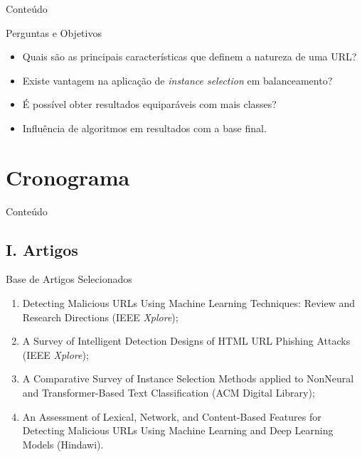 \documentclass{beamer}
\begin{document}
\begin{frame}{Conteúdo} 
     \tableofcontents[currentsection]
\end{frame}

\begin{frame}{Perguntas e Objetivos}
    
    \begin{itemize}[<+-| alert@+>]
        \setlength{\itemsep}{10pt}
        \item Quais são as principais características que definem a natureza de uma URL?
        \item Existe vantagem na aplicação de \emph{instance selection} em balanceamento?
        \item É possível obter resultados equiparáveis com mais classes?
        \item Influência de algoritmos em resultados com a base final.
    \end{itemize}
    
\end{frame}

\section{Cronograma}

\begin{frame}{Conteúdo} 
     \tableofcontents[currentsection]
\end{frame}

\subsection{I. Artigos}

\begin{frame}{Base de Artigos Selecionados}

    \begin{enumerate}[<+-| alert@+>]
        \setlength{\itemsep}{10pt}
        \item Detecting Malicious URLs Using Machine Learning Techniques: Review and Research Directions (IEEE \emph{Xplore\textregistered});
        \item A Survey of Intelligent Detection Designs of HTML URL Phishing Attacks (IEEE \emph{Xplore\textregistered});
        \item A Comparative Survey of Instance Selection Methods applied to NonNeural and Transformer-Based Text Classification (ACM Digital Library);
        \item An Assessment of Lexical, Network, and Content-Based Features for Detecting Malicious URLs Using Machine Learning and Deep Learning Models (Hindawi). \nocite{*}
    \end{enumerate}
    
\end{frame}
\end{document}
